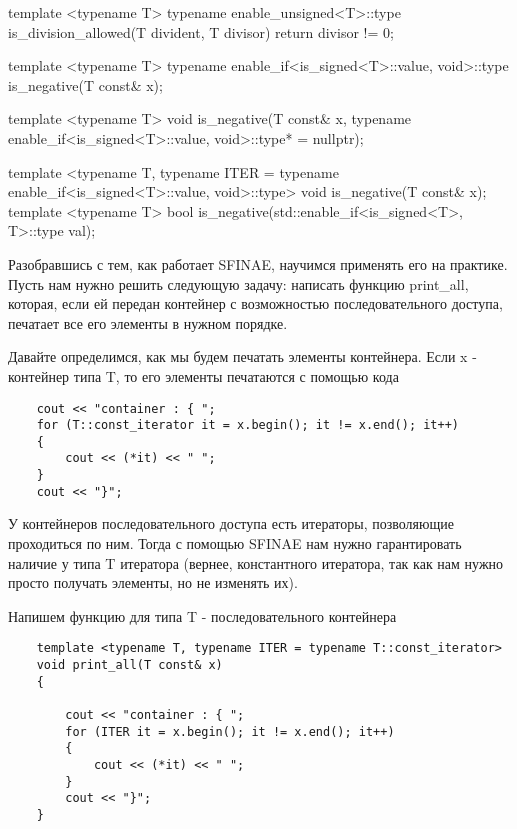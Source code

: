 template <typename T>
typename enable_unsigned<T>::type is_division_allowed(T divident, T divisor)
{
    return divisor != 0;
}



template <typename T>
typename enable_if<is_signed<T>::value, void>::type is_negative(T const& x);

template <typename T>
void is_negative(T const& x, typename enable_if<is_signed<T>::value, void>::type* = nullptr);

template <typename T, typename ITER = typename enable_if<is_signed<T>::value, void>::type>
void is_negative(T const& x);
template <typename T>
bool is_negative(std::enable_if<is_signed<T>, T>::type val);



	Разобравшись с тем, как работает SFINAE, научимся применять его на практике. Пусть нам нужно решить следующую задачу: написать функцию print\_all, которая, если ей передан контейнер с возможностью последовательного доступа, печатает все его элементы в нужном порядке.
	
	Давайте определимся, как мы будем печатать элементы контейнера. Если x - контейнер типа T, то его элементы печатаются с помощью кода

	\begin{verbatim}
	cout << "container : { ";
	for (T::const_iterator it = x.begin(); it != x.end(); it++)
	{
	    cout << (*it) << " ";
	} 
	cout << "}";
	\end{verbatim}

	У контейнеров последовательного доступа есть итераторы, позволяющие проходиться по ним. Тогда с помощью SFINAE нам нужно гарантировать наличие у типа T итератора (вернее, константного итератора, так как нам нужно просто получать элементы, но не изменять их).
	
	Напишем функцию для типа T - последовательного контейнера

	\begin{verbatim}
	template <typename T, typename ITER = typename T::const_iterator>
	void print_all(T const& x)
	{

	    cout << "container : { ";
	    for (ITER it = x.begin(); it != x.end(); it++)
	    {
	        cout << (*it) << " ";
	    } 
	    cout << "}";
	}
	\end{verbatim}
	

